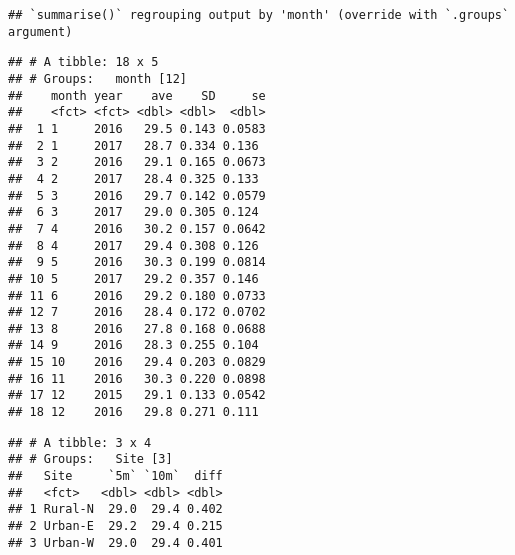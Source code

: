 \documentclass[
]{article}
\newenvironment{Shaded}{\begin{snugshade}}{\end{snugshade}}
\newcommand{\DataTypeTok}[1]{\textcolor[rgb]{0.13,0.29,0.53}{#1}}
\newcommand{\KeywordTok}[1]{\textcolor[rgb]{0.13,0.29,0.53}{\textbf{#1}}}
\newcommand{\NormalTok}[1]{#1}
\newcommand{\OperatorTok}[1]{\textcolor[rgb]{0.81,0.36,0.00}{\textbf{#1}}}
\newcommand{\StringTok}[1]{\textcolor[rgb]{0.31,0.60,0.02}{#1}}
\begin{document}
\begin{verbatim}
## `summarise()` regrouping output by 'month' (override with `.groups` argument)
\end{verbatim}

\begin{verbatim}
## # A tibble: 18 x 5
## # Groups:   month [12]
##    month year    ave    SD     se
##    <fct> <fct> <dbl> <dbl>  <dbl>
##  1 1     2016   29.5 0.143 0.0583
##  2 1     2017   28.7 0.334 0.136 
##  3 2     2016   29.1 0.165 0.0673
##  4 2     2017   28.4 0.325 0.133 
##  5 3     2016   29.7 0.142 0.0579
##  6 3     2017   29.0 0.305 0.124 
##  7 4     2016   30.2 0.157 0.0642
##  8 4     2017   29.4 0.308 0.126 
##  9 5     2016   30.3 0.199 0.0814
## 10 5     2017   29.2 0.357 0.146 
## 11 6     2016   29.2 0.180 0.0733
## 12 7     2016   28.4 0.172 0.0702
## 13 8     2016   27.8 0.168 0.0688
## 14 9     2016   28.3 0.255 0.104 
## 15 10    2016   29.4 0.203 0.0829
## 16 11    2016   30.3 0.220 0.0898
## 17 12    2015   29.1 0.133 0.0542
## 18 12    2016   29.8 0.271 0.111
\end{verbatim}

\begin{Shaded}
\end{Shaded}

\begin{verbatim}
## # A tibble: 3 x 4
## # Groups:   Site [3]
##   Site     `5m` `10m`  diff
##   <fct>   <dbl> <dbl> <dbl>
## 1 Rural-N  29.0  29.4 0.402
## 2 Urban-E  29.2  29.4 0.215
## 3 Urban-W  29.0  29.4 0.401
\end{verbatim}

\begin{Shaded}
\end{Shaded}
\end{document}
